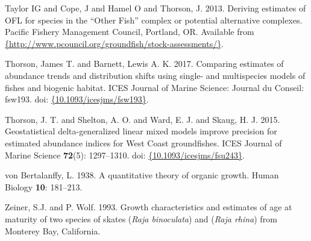 \documentclass[12pt,]{article}
\begin{document}
\leavevmode\hypertarget{ref-Taylor2013}{}%
Taylor IG and Cope, J and Hamel O and Thorson, J. 2013. Deriving
estimates of OFL for species in the ``Other Fish'' complex or potential
alternative complexes. Pacific Fishery Management Council, Portland, OR.
Available from
\href{\%7Bhttp://www.pcouncil.org/groundfish/stock-assessments/\%7D}{\{http://www.pcouncil.org/groundfish/stock-assessments/\}}.

\leavevmode\hypertarget{ref-Thorson2017a}{}%
Thorson, James T. and Barnett, Lewis A. K. 2017. Comparing estimates of
abundance trends and distribution shifts using single- and multispecies
models of fishes and biogenic habitat. ICES Journal of Marine Science:
Journal du Conseil: fsw193. doi:
\href{https://doi.org/\%7B10.1093/icesjms/fsw193\%7D}{\{10.1093/icesjms/fsw193\}}.

\leavevmode\hypertarget{ref-Thorson2015}{}%
Thorson, J. T. and Shelton, A. O. and Ward, E. J. and Skaug, H. J. 2015.
Geostatistical delta-generalized linear mixed models improve precision
for estimated abundance indices for West Coast groundfishes. ICES
Journal of Marine Science \textbf{72}(5): 1297--1310. doi:
\href{https://doi.org/\%7B10.1093/icesjms/fsu243\%7D}{\{10.1093/icesjms/fsu243\}}.

\leavevmode\hypertarget{ref-VonB}{}%
von Bertalanffy, L. 1938. A quantitative theory of organic growth. Human
Biology \textbf{10}: 181--213.

\leavevmode\hypertarget{ref-ZeinerWolf1993}{}%
Zeiner, S.J. and P. Wolf. 1993. Growth characteristics and estimates of
age at maturity of two species of skates (\emph{Raja binoculata}) and
(\emph{Raja rhina}) from Monterey Bay, California.
\end{document}
